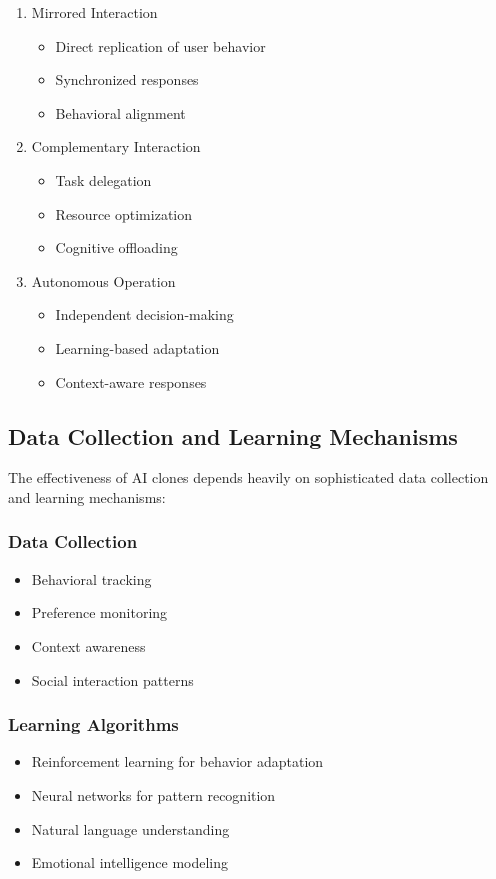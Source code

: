 \begin{enumerate}
\item Mirrored Interaction
\begin{itemize}
\item Direct replication of user behavior
\item Synchronized responses
\item Behavioral alignment
\end{itemize}

\item Complementary Interaction
\begin{itemize}
\item Task delegation
\item Resource optimization
\item Cognitive offloading
\end{itemize}

\item Autonomous Operation
\begin{itemize}
\item Independent decision-making
\item Learning-based adaptation
\item Context-aware responses
\end{itemize}
\end{enumerate}

\subsection{Data Collection and Learning Mechanisms}

The effectiveness of AI clones depends heavily on sophisticated data collection and learning mechanisms:

\subsubsection{Data Collection}
\begin{itemize}
\item Behavioral tracking
\item Preference monitoring
\item Context awareness
\item Social interaction patterns
\end{itemize}

\subsubsection{Learning Algorithms}
\begin{itemize}
\item Reinforcement learning for behavior adaptation
\item Neural networks for pattern recognition
\item Natural language understanding
\item Emotional intelligence modeling
\end{itemize}

